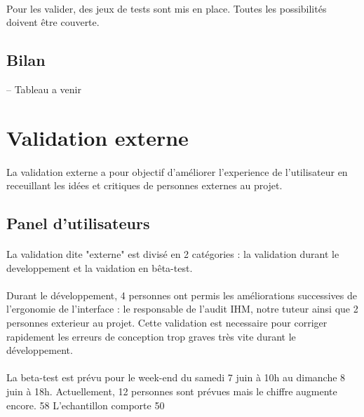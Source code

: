 \documentclass[11pt]{article} %
\begin{document}
\paragraph{}
Pour les valider, des jeux de tests sont mis en place. Toutes les possibilités doivent être couverte.




\subsection{Bilan}
-- Tableau a venir

\section{Validation externe}
\paragraph{}
La validation externe a pour objectif d'améliorer l'experience de l'utilisateur en receuillant les idées et critiques de personnes externes au projet.

\subsection{Panel d'utilisateurs}
\paragraph{}
La validation dite "externe" est divisé en 2 catégories : la validation durant le developpement et la vaidation en bêta-test. 
\paragraph{}
Durant le développement, 4 personnes ont permis les améliorations successives de l'ergonomie de l'interface : le responsable de l'audit IHM, notre tuteur ainsi que 2 personnes exterieur au projet. Cette validation est necessaire pour corriger rapidement les erreurs de conception trop graves très vite durant le développement.
\paragraph{}
La beta-test est prévu pour le week-end du samedi 7 juin à 10h au dimanche 8 juin à 18h. Actuellement, 12 personnes sont prévues mais le chiffre augmente encore.
58%
L'echantillon comporte 50%
\end{document}
